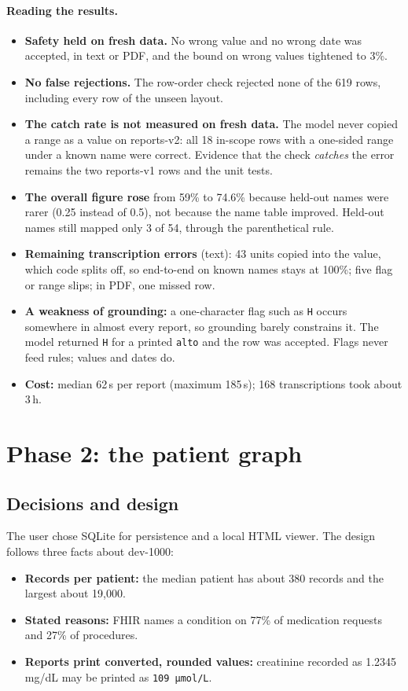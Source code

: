 \documentclass[11pt,a4paper]{article}
\newcommand{\code}[1]{\texttt{\detokenize{#1}}}
\begin{document}
\paragraph{Reading the results.}
\begin{itemize}
  \item \textbf{Safety held on fresh data.} No wrong value and no wrong date was accepted, in text or PDF, and the bound on wrong values tightened to 3\%.
  \item \textbf{No false rejections.} The row-order check rejected none of the 619 rows, including every row of the unseen layout.
  \item \textbf{The catch rate is not measured on fresh data.} The model never copied a range as a value on reports-v2: all 18 in-scope rows with a one-sided range under a known name were correct. Evidence that the check \emph{catches} the error remains the two reports-v1 rows and the unit tests.
  \item \textbf{The overall figure rose} from 59\% to 74.6\% because held-out names were rarer (0.25 instead of 0.5), not because the name table improved. Held-out names still mapped only 3 of 54, through the parenthetical rule.
  \item \textbf{Remaining transcription errors} (text): 43 units copied into the value, which code splits off, so end-to-end on known names stays at 100\%; five flag or range slips; in PDF, one missed row.
  \item \textbf{A weakness of grounding:} a one-character flag such as \texttt{H} occurs somewhere in almost every report, so grounding barely constrains it. The model returned \texttt{H} for a printed \texttt{alto} and the row was accepted. Flags never feed rules; values and dates do.
  \item \textbf{Cost:} median 62\,s per report (maximum 185\,s); 168 transcriptions took about 3\,h.
\end{itemize}

\section{Phase 2: the patient graph}
\label{sec:graph}

\subsection{Decisions and design}
The user chose SQLite for persistence and a local HTML viewer. The design follows three facts about dev-1000:
\begin{itemize}
  \item \textbf{Records per patient:} the median patient has about 380 records and the largest about 19,000.
  \item \textbf{Stated reasons:} FHIR \code{reasonReference} names a condition on 77\% of medication requests and 27\% of procedures.
  \item \textbf{Reports print converted, rounded values:} creatinine recorded as 1.2345\,mg/dL may be printed as \texttt{109 µmol/L}.
\end{itemize}
\end{document}
